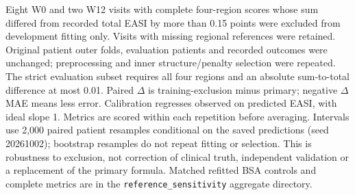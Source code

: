 \begin{table}[htbp]
\par\small\raggedright Eight W0 and two W12 visits with complete four-region scores whose sum differed from recorded total EASI by more than 0.15 points were excluded from development fitting only. Visits with missing regional references were retained. Original patient outer folds, evaluation patients and recorded outcomes were unchanged; preprocessing and inner structure/penalty selection were repeated. The strict evaluation subset requires all four regions and an absolute sum-to-total difference at most 0.01. Paired $\Delta$ is training-exclusion minus primary; negative $\Delta$MAE means less error. Calibration regresses observed on predicted EASI, with ideal slope 1. Metrics are scored within each repetition before averaging. Intervals use 2,000 paired patient resamples conditional on the saved predictions (seed 20261002); bootstrap resamples do not repeat fitting or selection. This is robustness to exclusion, not correction of clinical truth, independent validation or a replacement of the primary formula. Matched refitted BSA controls and complete metrics are in the \texttt{reference\_sensitivity} aggregate directory.
\end{table}
